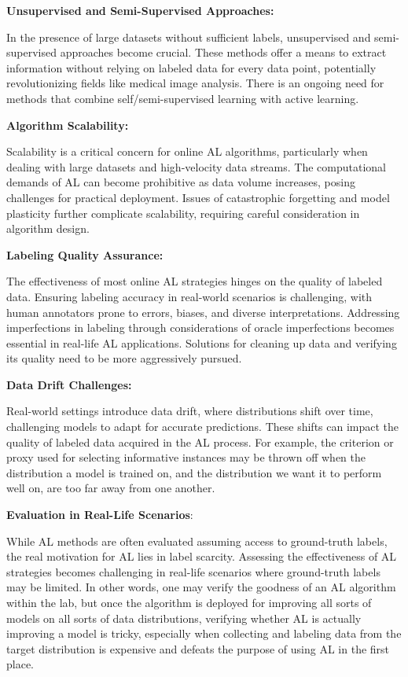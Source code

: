 \documentclass[
  letterpaper,
  numbers=noenddot,
  DIV=11,
  oneside]{scrreprt}
\theoremstyle{remark}
\begin{document}
\textbf{Unsupervised and Semi-Supervised Approaches:}

In the presence of large datasets without sufficient labels,
unsupervised and semi-supervised approaches become crucial. These
methods offer a means to extract information without relying on labeled
data for every data point, potentially revolutionizing fields like
medical image analysis. There is an ongoing need for methods that
combine self/semi-supervised learning with active learning.

\textbf{Algorithm Scalability:}

Scalability is a critical concern for online AL algorithms, particularly
when dealing with large datasets and high-velocity data streams. The
computational demands of AL can become prohibitive as data volume
increases, posing challenges for practical deployment. Issues of
catastrophic forgetting and model plasticity further complicate
scalability, requiring careful consideration in algorithm design.

\textbf{Labeling Quality Assurance:}

The effectiveness of most online AL strategies hinges on the quality of
labeled data. Ensuring labeling accuracy in real-world scenarios is
challenging, with human annotators prone to errors, biases, and diverse
interpretations. Addressing imperfections in labeling through
considerations of oracle imperfections becomes essential in real-life AL
applications. Solutions for cleaning up data and verifying its quality
need to be more aggressively pursued.

\textbf{Data Drift Challenges:}

Real-world settings introduce data drift, where distributions shift over
time, challenging models to adapt for accurate predictions. These shifts
can impact the quality of labeled data acquired in the AL process. For
example, the criterion or proxy used for selecting informative instances
may be thrown off when the distribution a model is trained on, and the
distribution we want it to perform well on, are too far away from one
another.

\textbf{Evaluation in Real-Life Scenarios}:

While AL methods are often evaluated assuming access to ground-truth
labels, the real motivation for AL lies in label scarcity. Assessing the
effectiveness of AL strategies becomes challenging in real-life
scenarios where ground-truth labels may be limited. In other words, one
may verify the goodness of an AL algorithm within the lab, but once the
algorithm is deployed for improving all sorts of models on all sorts of
data distributions, verifying whether AL is actually improving a model
is tricky, especially when collecting and labeling data from the target
distribution is expensive and defeats the purpose of using AL in the
first place.
\end{document}
